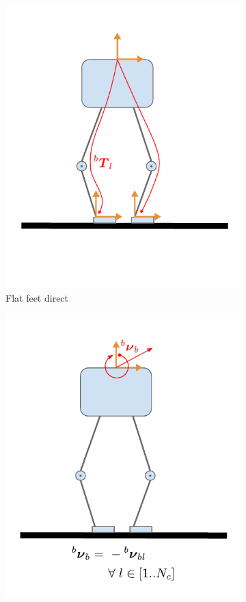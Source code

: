 \begin{figure}
\begin{subfigure}{.33\linewidth}
        \includegraphics[width=\textwidth]{figures/robot_kinematic_types_flat_direct.pdf}
        \caption{Flat feet direct}
    \end{subfigure}%
        \hfill
    \begin{subfigure}{.33\linewidth}
        \label{fig:kin_flat_vel}
        \centering
        \includegraphics[width=\textwidth]{figures/robot_kinematic_types_flat_vel.pdf}

\end{subfigure}
\end{figure}
